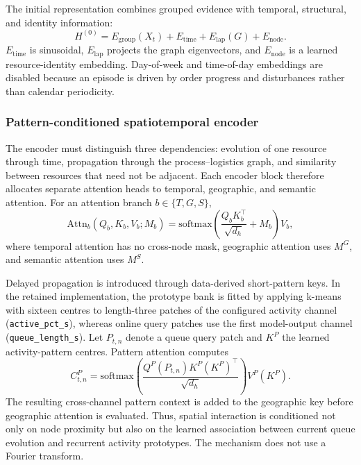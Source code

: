 \documentclass[a4paper,fleqn]{cas-dc}
\begin{document}
The initial representation combines grouped evidence with temporal, structural, and identity information:
\begin{equation}
H^{(0)}=E_{\mathrm{group}}(X_t)+
E_{\mathrm{time}}+E_{\mathrm{lap}}(G)+E_{\mathrm{node}}.
\end{equation}
$E_{\mathrm{time}}$ is sinusoidal, $E_{\mathrm{lap}}$ projects the graph eigenvectors, and $E_{\mathrm{node}}$ is a learned resource-identity embedding. Day-of-week and time-of-day embeddings are disabled because an episode is driven by order progress and disturbances rather than calendar periodicity.


\subsubsection{Pattern-conditioned spatiotemporal encoder}

The encoder must distinguish three dependencies: evolution of one resource through time, propagation through the process--logistics graph, and similarity between resources that need not be adjacent. Each encoder block therefore allocates separate attention heads to temporal, geographic, and semantic attention. For an attention branch $b\in\{T,G,S\}$,
\begin{equation}
\mathrm{Attn}_{b}(Q_b,K_b,V_b;M_b)
=\mathrm{softmax}\!\left(
\frac{Q_bK_b^\top}{\sqrt{d_h}}+M_b
\right)V_b ,
\end{equation}
where temporal attention has no cross-node mask, geographic attention uses $M^G$, and semantic attention uses $M^S$.


Delayed propagation is introduced through data-derived short-pattern keys. In the retained implementation, the prototype bank is fitted by applying k-means with sixteen centres to length-three patches of the configured activity channel (\texttt{active\_pct\_s}), whereas online query patches use the first model-output channel (\texttt{queue\_length\_s}). Let $P_{t,n}$ denote a queue query patch and $K^P$ the learned activity-pattern centres. Pattern attention computes
\begin{equation}
C^P_{t,n}=
\mathrm{softmax}\!\left(
\frac{Q^P(P_{t,n})K^P(K^P)^\top}{\sqrt{d_h}}
\right)V^P(K^P).
\end{equation}
The resulting cross-channel pattern context is added to the geographic key before geographic attention is evaluated. Thus, spatial interaction is conditioned not only on node proximity but also on the learned association between current queue evolution and recurrent activity prototypes. The mechanism does not use a Fourier transform.
\end{document}

